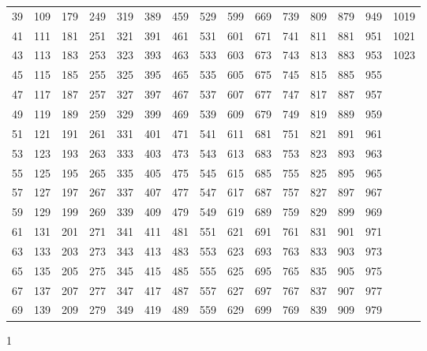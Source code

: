 \documentclass{assignment}
\begin{document}
\begin{tabular}{r r r r r r r r r r r r r r r}
39 & 109 & 179 & 249 & 319 & 389 & 459 & 529 & 599 & 669 & 739 & 809 & 879 & 949 & 1019 \\
41 & 111 & 181 & 251 & 321 & 391 & 461 & 531 & 601 & 671 & 741 & 811 & 881 & 951 & 1021 \\
43 & 113 & 183 & 253 & 323 & 393 & 463 & 533 & 603 & 673 & 743 & 813 & 883 & 953 & 1023 \\
45 & 115 & 185 & 255 & 325 & 395 & 465 & 535 & 605 & 675 & 745 & 815 & 885 & 955 \\
47 & 117 & 187 & 257 & 327 & 397 & 467 & 537 & 607 & 677 & 747 & 817 & 887 & 957 \\
49 & 119 & 189 & 259 & 329 & 399 & 469 & 539 & 609 & 679 & 749 & 819 & 889 & 959 \\
51 & 121 & 191 & 261 & 331 & 401 & 471 & 541 & 611 & 681 & 751 & 821 & 891 & 961 \\
53 & 123 & 193 & 263 & 333 & 403 & 473 & 543 & 613 & 683 & 753 & 823 & 893 & 963 \\
55 & 125 & 195 & 265 & 335 & 405 & 475 & 545 & 615 & 685 & 755 & 825 & 895 & 965 \\
57 & 127 & 197 & 267 & 337 & 407 & 477 & 547 & 617 & 687 & 757 & 827 & 897 & 967 \\
59 & 129 & 199 & 269 & 339 & 409 & 479 & 549 & 619 & 689 & 759 & 829 & 899 & 969 \\
61 & 131 & 201 & 271 & 341 & 411 & 481 & 551 & 621 & 691 & 761 & 831 & 901 & 971 \\
63 & 133 & 203 & 273 & 343 & 413 & 483 & 553 & 623 & 693 & 763 & 833 & 903 & 973 \\
65 & 135 & 205 & 275 & 345 & 415 & 485 & 555 & 625 & 695 & 765 & 835 & 905 & 975 \\
67 & 137 & 207 & 277 & 347 & 417 & 487 & 557 & 627 & 697 & 767 & 837 & 907 & 977 \\
69 & 139 & 209 & 279 & 349 & 419 & 489 & 559 & 629 & 699 & 769 & 839 & 909 & 979 \\
\end{tabular}
\newpage


1\\
\\
\end{document}

